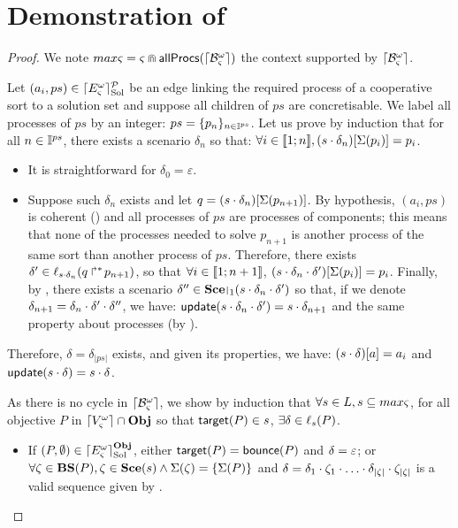 \appendix

\section{Demonstration of }
\label{suppl:demoapproxinf}

\begin{proof} 
We note $max\varsigma = \varsigma \Cap \mathsf{allProcs}(\lceil \mathcal{B}_\varsigma^\omega\rceil)$ the context supported by $\lceil \mathcal{B}_\varsigma^\omega\rceil$.

Let $(a_i, ps) \in \lceil E_\varsigma^\omega\rceil^{\mathcal{P}}_{\mathrm{Sol}}$ be an edge linking the required process of a cooperative sort to a solution set and suppose all children of $ps$ are concretisable.
We label all processes of $ps$ by an integer: $ps = \{ p_n \}_{n \in \mathbb{I}^{ps}}$.
Let us prove by induction that for all $n \in \mathbb{I}^{ps}$, there exists a scenario $\delta_n$ so that:
$\forall i \in \llbracket 1; n \rrbracket, {(s \cdot \delta_n)[\Sigma(p_i)]} = p_i$.
\begin{itemize}
  \item It is straightforward for $\delta_0 = \varepsilon$.
  \item Suppose such $\delta_n$ exists and let $q = {(s \cdot \delta_n)[\Sigma(p_{n+1})]}$.
    By hypothesis, $(a_i, ps)$ is coherent () and all processes of $ps$ are processes of components;
    this means that none of the processes needed to solve $p_{n+1}$ is another process of the same sort than another process of $ps$.
    Therefore, there exists $\delta' \in \ell_{s \cdot \delta_n}(\mbox{$q\Rsh^*\!p_{n+1}$})$,
    so that $\forall i \in \llbracket 1; n+1 \rrbracket$, ${(s \cdot \delta_n \cdot \delta')[\Sigma(p_{i})]} = p_{i}$.
    Finally, by , there exists a scenario $\delta'' \in \restriction{\Sce}{1}(s \PHplay \delta_n \PHplay \delta')$
    so that, if we denote $\delta_{n+1} = \delta_n \cdot \delta' \cdot \delta''$,
    we have: $\mathsf{update}(s \cdot \delta_n \cdot \delta') = s \cdot \delta_{n+1}$ and the same property about processes (by ).
\end{itemize}
Therefore, $\delta = \delta_{|ps|}$ exists, and given its properties, we have: ${(s \cdot \delta)[a]} = a_i$
and $\mathsf{update}(s \cdot \delta) = s \cdot \delta$.

As there is no cycle in $\lceil \mathcal{B}_\varsigma^\omega\rceil$, we show by induction that $\forall s\in L, s\subseteq max\varsigma$, 
for all objective $P$ in $\lceil V_\varsigma^\omega\rceil \cap \mathbf{Obj}$ so that $\mathsf{target}(P) \in s$,
$\exists \delta \in \ell_s(P)$.%
\begin{itemize}
  \item If $(P, \emptyset) \in \lceil E_\varsigma^\omega\rceil^{\mathbf{Obj}}_{\mathrm{Sol}}$, either $\mathsf{target}(P) = \mathsf{bounce}(P)$ and $\delta = \varepsilon$;
    or $\forall \zeta \in \mathbf{BS}(P), \zeta \in \mathbf{Sce}(s) \wedge \Sigma(\zeta) = \{ \Sigma(P) \}$
    and $\delta = \delta_1 \PHplay \zeta_1 \PHplay \dots \PHplay \delta_{|\zeta|} \PHplay \zeta_{|\zeta|}$ is a valid sequence given by .


\end{itemize}
\end{proof}
